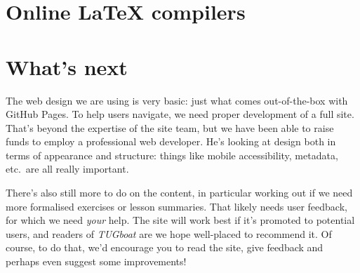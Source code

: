 \documentclass[harvardcite]{ltugboat}
\begin{document}
\section{Online \LaTeX{} compilers}

\section{What's next}

The web design we are using is very basic: just what comes out-of-the-box with
GitHub Pages. To help users navigate, we need proper development of a full
site. That's beyond the expertise of the site team, but we have been able to
raise funds to employ a professional web developer. He's looking at design both
in terms of appearance and structure: things like mobile accessibility,
metadata, etc.\ are all really important.

There's also still more to do on the content, in particular working out if we
need more formalised exercises or lesson summaries. That likely needs user
feedback, for which we need \emph{your} help. The site will work best if it's
promoted to potential users, and readers of \emph{TUGboat} are we hope
well-placed to recommend it. Of course, to do that, we'd encourage you to read
the site, give feedback and perhaps even suggest some improvements!

\makesignature
\end{document}
